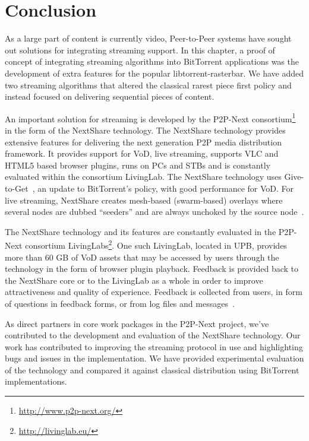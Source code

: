 \section{Conclusion}
\label{sec:multimedia-dist:conclusion}

As a large part of content is currently video, Peer-to-Peer systems have
sought out solutions for integrating streaming support. In this chapter, a
proof of concept of integrating streaming algorithms into BitTorrent
applications was the development of extra features for the popular
libtorrent-rasterbar. We have added two streaming algorithms that altered the
classical rarest piece first policy and instead focused on delivering
sequential pieces of content.

An important solution for streaming is developed by the P2P-Next
consortium\footnote{\url{http://www.p2p-next.org/}} in the form of the NextShare
technology. The NextShare technology provides extensive features for
delivering the next generation P2P media distribution framework. It provides
support for VoD, live streaming, supports VLC and HTML5 based browser plugins,
runs on PCs and STBs and is constantly evaluated within the consortium
LivingLab. The NextShare technology uses Give-to-Get~\cite{give-to-get}, an
update to BitTorrent's policy, with good performance for VoD. For live
streaming, NextShare creates mesh-based (swarm-based) overlays where several
nodes are dubbed ``seeders'' and are always unchoked by the source
node~\cite{design-p2p-live}.

The NextShare technology and its features are constantly evaluated in the
P2P-Next consortium LivingLabs\footnote{\url{http://livinglab.eu/}}. One such
LivingLab, located in UPB, provides more than 60 GB of VoD assets that may be
accessed by users through the technology in the form of browser plugin
playback.  Feedback is provided back to the NextShare core or to the LivingLab
as a whole in order to improve attractiveness and quality of experience.
Feedback is collected from users, in form of questions in feedback forms, or
from log files and messages~\cite{bt-swarm-analysis}.

As direct partners in core work packages in the P2P-Next project, we've
contributed to the development and evaluation of the NextShare technology. Our
work has contributed to improving the streaming protocol in use and
highlighting bugs and issues in the implementation. We have provided
experimental evaluation of the technology and compared it against classical
distribution using BitTorrent implementations.

